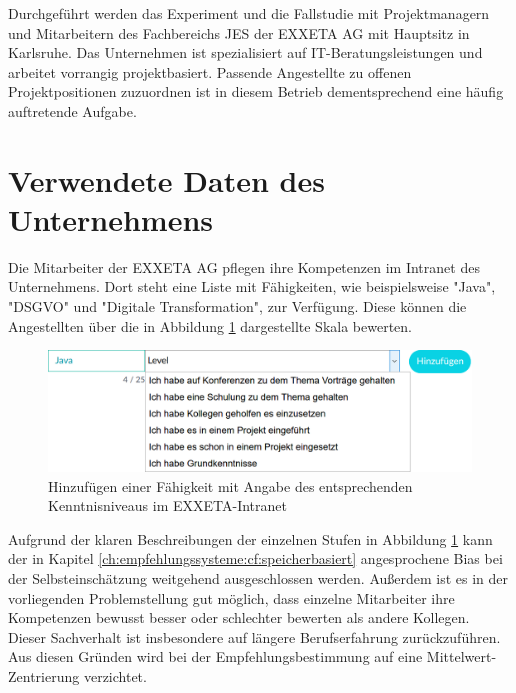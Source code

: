 Durchgeführt werden das Experiment und die Fallstudie mit Projektmanagern und Mitarbeitern des Fachbereichs \ac{JES} der EXXETA AG mit Hauptsitz in Karlsruhe. Das Unternehmen ist spezialisiert auf IT-Beratungsleistungen und arbeitet vorrangig projektbasiert. Passende Angestellte zu offenen Projektpositionen zuzuordnen ist in diesem Betrieb dementsprechend eine häufig auftretende Aufgabe.

\section{Verwendete Daten des Unternehmens}
\label{ch:methodik:versuchsaufbau}
Die Mitarbeiter der EXXETA AG pflegen ihre Kompetenzen im Intranet des Unternehmens. Dort steht eine Liste mit \anzFaehigkeiten Fähigkeiten, wie beispielsweise "Java", "DSGVO" und "Digitale Transformation", zur Verfügung. Diese können die Angestellten über die in Abbildung \ref{fig:methodik:versuchsaufbau:daten:abb1} dargestellte Skala bewerten.

\begin{figure}[h]
	\centering
	\includegraphics[width=1\textwidth]{gfx/skill-level.png}
	\caption{Hinzufügen einer Fähigkeit mit Angabe des entsprechenden Kenntnisniveaus im EXXETA-Intranet}
	\label{fig:methodik:versuchsaufbau:daten:abb1}
\end{figure}

Aufgrund der klaren Beschreibungen der einzelnen Stufen in Abbildung \ref{fig:methodik:versuchsaufbau:daten:abb1} kann der in Kapitel \ref{ch:empfehlungssysteme:cf:speicherbasiert} angesprochene Bias bei der Selbsteinschätzung weitgehend ausgeschlossen werden. Außerdem ist es in der vorliegenden Problemstellung gut möglich, dass einzelne Mitarbeiter ihre Kompetenzen bewusst besser oder schlechter bewerten als andere Kollegen. Dieser Sachverhalt ist insbesondere auf längere Berufserfahrung zurückzuführen. Aus diesen Gründen wird bei der Empfehlungsbestimmung auf eine Mittelwert-Zentrierung verzichtet.

